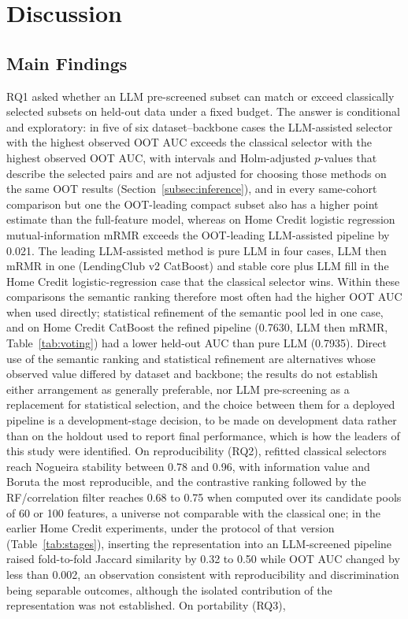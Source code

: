 \documentclass[final,5p,twocolumn]{elsarticle}
\begin{document}

\section{Discussion}
\label{sec:discussion}

\subsection{Main Findings}
\label{subsec:main_findings}

RQ1 asked whether an LLM pre-screened subset can match or exceed classically selected subsets on held-out data under a fixed budget. The answer is conditional and exploratory: in five of six dataset--backbone cases the LLM-assisted selector with the highest observed OOT AUC exceeds the classical selector with the highest observed OOT AUC, with intervals and Holm-adjusted $p$-values that describe the selected pairs and are not adjusted for choosing those methods on the same OOT results (Section~\ref{subsec:inference}), and in every same-cohort comparison but one the OOT-leading compact subset also has a higher point estimate than the full-feature model, whereas on Home Credit logistic regression mutual-information mRMR exceeds the OOT-leading LLM-assisted pipeline by 0.021. The leading LLM-assisted method is pure LLM in four cases, LLM then mRMR in one (LendingClub v2 CatBoost) and stable core plus LLM fill in the Home Credit logistic-regression case that the classical selector wins. Within these comparisons the semantic ranking therefore most often had the higher OOT AUC when used directly; statistical refinement of the semantic pool led in one case, and on Home Credit CatBoost the refined pipeline (0.7630, LLM then mRMR, Table~\ref{tab:voting}) had a lower held-out AUC than pure LLM (0.7935). Direct use of the semantic ranking and statistical refinement are alternatives whose observed value differed by dataset and backbone; the results do not establish either arrangement as generally preferable, nor LLM pre-screening as a replacement for statistical selection, and the choice between them for a deployed pipeline is a development-stage decision, to be made on development data rather than on the holdout used to report final performance, which is how the leaders of this study were identified. On reproducibility (RQ2), refitted classical selectors reach Nogueira stability between 0.78 and 0.96, with information value and Boruta the most reproducible, and the contrastive ranking followed by the RF/correlation filter reaches 0.68 to 0.75 when computed over its candidate pools of 60 or 100 features, a universe not comparable with the classical one; in the earlier Home Credit experiments, under the protocol of that version (Table~\ref{tab:stages}), inserting the representation into an LLM-screened pipeline raised fold-to-fold Jaccard similarity by 0.32 to 0.50 while OOT AUC changed by less than 0.002, an observation consistent with reproducibility and discrimination being separable outcomes, although the isolated contribution of the representation was not established. On portability (RQ3), 
\end{document}
